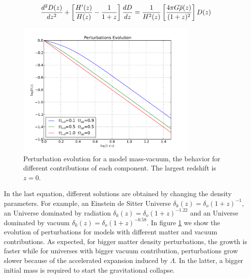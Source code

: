 \begin{equation}
\frac{d^2D(z)}{dz^2}+\left[ \frac{H'(z)}{H(z)} -\frac{1}{1+z}\right]\frac{d D}{d z}
= \frac{1}{H^2(z)}\left[ \frac{4\pi G\overline{\rho}(z)}{(1+z)^2} \right]D(z) 
\nonumber
\end{equation}

\begin{figure}[htbp]
       \centering
               \includegraphics[width=0.8\textwidth]{Images/chapter2/masavacio.pdf}
       \caption{\small Perturbation evolution for a model mass-vacuum, the behavior
       for different contributions of each component. The largest redshift is $z=0$. }
       \label{masavacio}
 \end{figure}

In the last equation, different solutions are obtained by changing the density parameters. 
For example, an Einstein de Sitter Universe $\delta_k(z)=\delta_o(1+z)^{-1}$,  
an Universe dominated by radiation $\delta_k(z)=\delta_o(1+z)^{-1.22}$ and
an Universe dominated by vacuum $\delta_k(z)=\delta_o(1+z)^{-0.58}$. 
In figure \ref{masavacio} we show the evolution of perturbations for models with
different matter and vacuum contributions. As expected, for bigger matter density
perturbations, the growth is faster while for universes with bigger vacuum contribution, 
perturbations grow slower because of the accelerated expansion induced by $\Lambda$. 
In the latter, a bigger initial mass is required to start the gravitational collapse.

